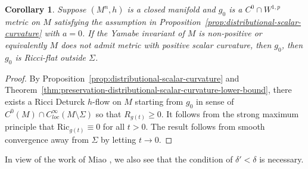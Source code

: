 \documentclass[12pt]{amsart}
\theoremstyle{plain}
\theoremstyle{plain}
\newtheorem{corollary}[subsection]{Corollary}
\theoremstyle{definition}
\theoremstyle{remark}
\numberwithin{equation}{subsection}
\begin{document}
\begin{corollary}\label{thm:non-cpt-dist-scalar-curvature-lower-bdd}
Suppose $(M^n,h)$ is a closed manifold and $g_0$ is a $C^0\cap W^{1,p}$ metric on $M$ satisfying the assumption in Proposition~\ref{prop:distributional-scalar-curvature} with $a=0$. If the Yamabe invariant of $M$ is non-positive or equivalently $M$ does not admit metric with positive scalar curvature, then $g_0$, then $g_0$ is Ricci-flat outside $\Sigma$.
\end{corollary}
\begin{proof}
By Proposition~\ref{prop:distributional-scalar-curvature} and Theorem~\ref{thm:preservation-distributional-scalar-curvature-lower-bound}, there exists a Ricci Deturck $h$-flow on $M$ starting from $g_0$ in sense of  $C^0(M)\cap C^\infty_{loc}(M\setminus\Sigma)$ so that $R_{g(t)}\geq 0$.  It follows from the strong maximum principle that $\mathrm{Ric}_{g(t)}\equiv 0$ for all $t>0$. The result follows from smooth convergence away from $\Sigma$ by letting $t\to0$.
\end{proof}
In view of the work of Miao \cite{miao_positive_2003}, we also see that the condition of $\delta'<\delta$ is necessary.

\printbibliography[title=References]
\end{document}
